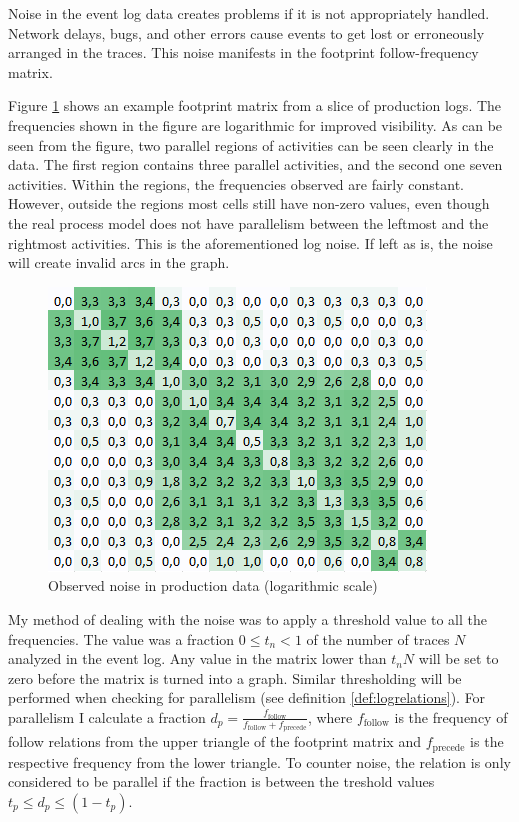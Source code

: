 Noise in the event log data creates problems if it is not appropriately handled. 
Network delays, bugs, and other errors cause events to get lost or erroneously arranged in the traces. 
This noise manifests in the footprint follow-frequency matrix.

Figure \ref{fig:examplenoise} shows an example footprint matrix from a slice of production logs.
The frequencies shown in the figure are logarithmic for improved visibility.
As can be seen from the figure, two parallel regions of activities can be seen clearly in the data.
The first region contains three parallel activities, and the second one seven activities.
Within the regions, the frequencies observed are fairly constant.
However, outside the regions most cells still have non-zero values, even though the real process model
does not have parallelism between the leftmost and the rightmost activities.
This is the aforementioned log noise.
If left as is, the noise will create invalid arcs in the graph.

\begin{figure}[htb]
    \centering \includegraphics[width=0.6\linewidth]{gfx/graphs/noise.png}
    \caption{Observed noise in production data (logarithmic scale)}
    \label{fig:examplenoise}
\end{figure}

My method of dealing with the noise was to apply a threshold value to all the frequencies.
The value was a fraction $0 \le t_n < 1$ of the number of traces $N$ analyzed in the event log.
Any value in the matrix lower than $t_n N$ will be set to zero before the matrix is turned into a graph.
Similar thresholding will be performed when checking for parallelism (see definition \ref{def:logrelations}). 
For parallelism I calculate a fraction $d_p = \frac{f_\text{follow}}{f_\text{follow} + f_\text{precede}}$, where $f_\text{follow}$ is the frequency of follow relations from the upper triangle of the footprint matrix and $f_\text{precede}$ is the respective frequency from the lower triangle.
To counter noise, the relation is only considered to be parallel if the fraction is between the treshold values $t_p \le d_p \le (1 - t_p)$. 


